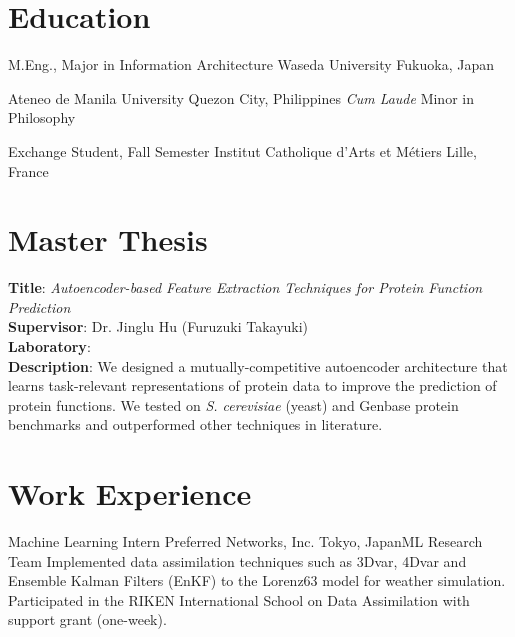 \documentclass[11pt,a4paper,sans]{moderncv}
\begin{document}
\maketitle


\section{Education}
        {M.Eng., Major in Information Architecture}
        {Waseda University}
        {Fukuoka, Japan}{}
        {}

        {Ateneo de Manila University}
        {Quezon City, Philippines}
        {\textit{Cum Laude}}
        {Minor in Philosophy}

        {Exchange Student, Fall Semester}
        {Institut Catholique d'Arts et M\'etiers}
        {Lille, France}{}
        {}

\section{Master Thesis}
\textbf{Title}: \emph{Autoencoder-based Feature Extraction Techniques for Protein Function Prediction}\\
\textbf{Supervisor}: Dr. Jinglu Hu (Furuzuki Takayuki)\\
\textbf{Laboratory}: {\color{blue}}\\
\textbf{Description}: We designed a mutually-competitive autoencoder architecture that learns
task-relevant representations of protein data to improve the prediction of protein functions.
We tested on \textit{S. cerevisiae} (yeast) and Genbase protein benchmarks and outperformed other
techniques in literature.

\section{Work Experience}

        {Machine Learning Intern}
        {Preferred Networks, Inc.}
        {Tokyo, Japan}{ML Research Team}
        {
        Implemented data assimilation techniques such as 3Dvar,
        4Dvar and Ensemble Kalman Filters (EnKF) to the Lorenz63 model
        for weather simulation. Participated in the RIKEN International
        School on Data Assimilation with support grant (one-week).
        }
\end{document}
